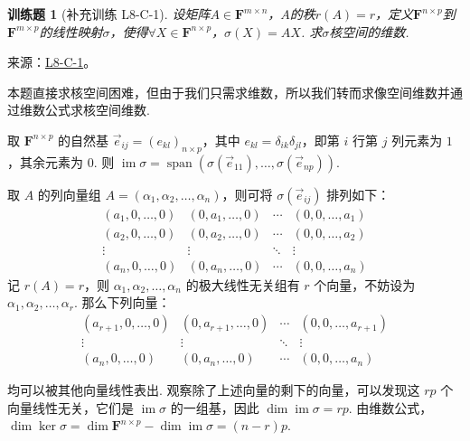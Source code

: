 \documentclass[UTF8,12pt,a4paper,fontset=fandol]{ctexart}
\newtheorem{exercise}{训练题}[section]
\begin{document}
\begin{exercise}[补充训练 L8-C-1]\label{prob:L8-C-1}
设矩阵$A \in \mathbf{F}^{m \times n}$，$A$的秩$r(A)=r$，定义$\mathbf{F}^{n \times p}$到$\mathbf{F}^{m \times p}$的线性映射$\sigma$，使得$\forall X \in \mathbf{F}^{n \times p}$，$\sigma(X)=AX$. 求$\sigma$核空间的维数.
\end{exercise}
\noindent 来源：\href{https://github.com/yhwu-is/Linear-Algebra-Left-Undone/blob/new/%E8%AE%B2%E4%B9%89/%E4%B8%93%E9%A2%98/8%20%E7%9B%B8%E6%8A%B5%E6%A0%87%E5%87%86%E5%BD%A2.tex}{L8-C-1}。
\begin{solve}
本题直接求核空间困难，但由于我们只需求维数，所以我们转而求像空间维数并通过维数公式求核空间维数.

          取 $ \mathbf{F}^{n \times p} $ 的自然基 $ \vec{e}_{ij} = (e_{kl})_{n \times p} $，其中 $ e_{kl} = \delta_{ik} \delta_{jl} $，即第 $ i $ 行第 $ j $ 列元素为 $ 1 $，其余元素为 $ 0 $. 则 $ \operatorname{im} \sigma = \operatorname{span}(\sigma(\vec{e}_{11}), \ldots, \sigma(\vec{e}_{np})) $.

          取 $ A $ 的列向量组 $ A = (\alpha_1, \alpha_2, \ldots, \alpha_n) $，则可将 $ \sigma(\vec{e}_{ij}) $ 排列如下：
          \[ \begin{matrix}
                  (a_1, 0, \ldots, 0) & (0, a_1, \ldots, 0) & \cdots & (0, 0, \ldots, a_1) \\
                  (a_2, 0, \ldots, 0) & (0, a_2, \ldots, 0) & \cdots & (0, 0, \ldots, a_2) \\
                  \vdots              & \vdots              & \ddots & \vdots              \\
                  (a_n, 0, \ldots, 0) & (0, a_n, \ldots, 0) & \cdots & (0, 0, \ldots, a_n)
              \end{matrix} \]
          记 $ r(A) = r $，则 $ \alpha_1, \alpha_2, \ldots, \alpha_n $ 的极大线性无关组有 $ r $ 个向量，不妨设为 $ \alpha_1, \alpha_2, \ldots, \alpha_r $. 那么下列向量：
          \[ \begin{matrix}
                  (a_{r+1}, 0, \ldots, 0) & (0, a_{r+1}, \ldots, 0) & \cdots & (0, 0, \ldots, a_{r+1}) \\
                  \vdots                  & \vdots                  & \ddots & \vdots                  \\
                  (a_n, 0, \ldots, 0)     & (0, a_n, \ldots, 0)     & \cdots & (0, 0, \ldots, a_n)
              \end{matrix} \]

          均可以被其他向量线性表出. 观察除了上述向量的剩下的向量，可以发现这 $ rp $ 个向量线性无关，它们是 $ \operatorname{im} \sigma $ 的一组基，因此 $ \dim \operatorname{im} \sigma = rp $. 由维数公式，$ \dim \ker \sigma = \dim \mathbf{F}^{n \times p} - \dim \operatorname{im} \sigma = (n - r)p $.
\end{solve}
\end{document}
